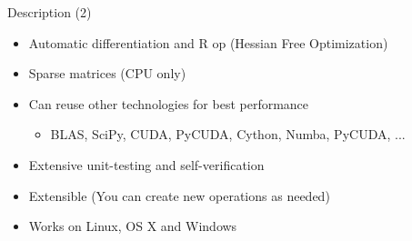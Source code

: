 \documentclass[utf8x,xcolor=pdftex,dvipsnames,table]{beamer}
\begin{document}
\begin{frame}{Description (2)}

  \begin{itemize}
    \item Automatic differentiation and R op (Hessian Free Optimization)
    \item Sparse matrices (CPU only)
    \item Can reuse other technologies for best performance
    \begin{itemize}
      \item BLAS, SciPy, CUDA, PyCUDA, Cython, Numba, PyCUDA, ...
    \end{itemize}
    \item Extensive unit-testing and self-verification
    \item Extensible (You can create new operations as needed)
    \item Works on Linux, OS X and Windows
  \end{itemize}
\end{frame}








\end{document}
